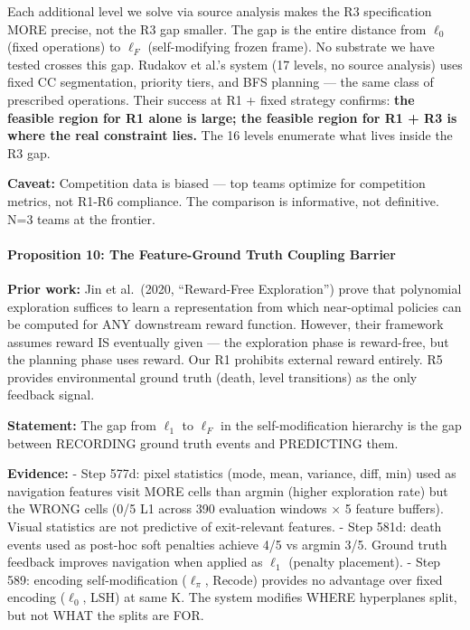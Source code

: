 \documentclass[
  11pt,
]{article}
\begin{document}
Each additional level we solve via source analysis makes the R3
specification MORE precise, not the R3 gap smaller. The gap is the
entire distance from \(\ell_0\) (fixed operations) to \(\ell_F\)
(self-modifying frozen frame). No substrate we have tested crosses this
gap. Rudakov et al.'s system (17 levels, no source analysis) uses fixed
CC segmentation, priority tiers, and BFS planning --- the same class of
prescribed operations. Their success at R1 + fixed strategy confirms:
\textbf{the feasible region for R1 alone is large; the feasible region
for R1 + R3 is where the real constraint lies.} The 16 levels enumerate
what lives inside the R3 gap.

\textbf{Caveat:} Competition data is biased --- top teams optimize for
competition metrics, not R1-R6 compliance. The comparison is
informative, not definitive. N=3 teams at the frontier.

\paragraph{Proposition 10: The Feature-Ground Truth Coupling
Barrier}\label{proposition-10-the-feature-ground-truth-coupling-barrier}

\textbf{Prior work:} Jin et al.~(2020, ``Reward-Free Exploration'')
prove that polynomial exploration suffices to learn a representation
from which near-optimal policies can be computed for ANY downstream
reward function. However, their framework assumes reward IS eventually
given --- the exploration phase is reward-free, but the planning phase
uses reward. Our R1 prohibits external reward entirely. R5 provides
environmental ground truth (death, level transitions) as the only
feedback signal.

\textbf{Statement:} The gap from \(\ell_1\) to \(\ell_F\) in the
self-modification hierarchy is the gap between RECORDING ground truth
events and PREDICTING them.

\textbf{Evidence:} - Step 577d: pixel statistics (mode, mean, variance,
diff, min) used as navigation features visit MORE cells than argmin
(higher exploration rate) but the WRONG cells (0/5 L1 across 390
evaluation windows × 5 feature buffers). Visual statistics are not
predictive of exit-relevant features. - Step 581d: death events used as
post-hoc soft penalties achieve 4/5 vs argmin 3/5. Ground truth feedback
improves navigation when applied as \(\ell_1\) (penalty placement). -
Step 589: encoding self-modification (\(\ell_\pi\), Recode) provides no
advantage over fixed encoding (\(\ell_0\), LSH) at same K. The system
modifies WHERE hyperplanes split, but not WHAT the splits are FOR.
\end{document}
